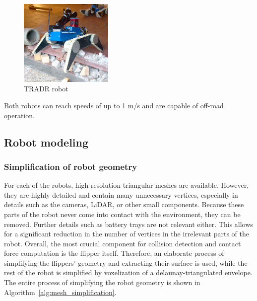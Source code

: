 \documentclass[a4paper,12pt]{article}
\begin{document}
\begin{figure}[!h]
  \centering
  \includegraphics[width=0.4\textwidth]{fig/tradr.jpg}
  \caption{TRADR robot \citep{TRADRphoto}}
  \label{fig:tradr}
\end{figure}

Both robots can reach speeds of up to 1 m/s and are capable of off-road operation.

\clearpage

\subsection{Robot modeling}
\label{sec:modeling}
\subsubsection{Simplification of robot geometry}
For each of the robots, high-resolution triangular meshes are available. However, they are highly detailed and contain many unnecessary vertices, especially in details such as the cameras, LiDAR, or other small components. Because these parts of the robot never come into contact with the environment, they can be removed. Further details such as battery trays are not relevant either. This allows for a significant reduction in the number of vertices in the irrelevant parts of the robot. Overall, the most crucial component for collision detection and contact force computation is the flipper itself. Therefore, an elaborate process of simplifying the flippers' geometry and extracting their surface is used, while the rest of the robot is simplified by voxelization of a delaunay-triangulated envelope. The entire process of simplifying the robot geometry is shown in Algorithm~\ref{alg:mesh_simplification}.
\end{document}
